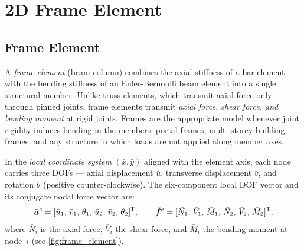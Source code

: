 \chapter{2D Frame Element}
\label{ch:frame}

\section{Frame Element}
\label{sec:frame_element}

A \emph{frame element} (beam-column) combines the axial stiffness of a bar
element with the bending stiffness of an Euler-Bernoulli beam element into a
single structural member. Unlike truss elements, which transmit axial force
only through pinned joints, frame elements transmit \emph{axial force, shear
force, and bending moment} at rigid joints. Frames are the appropriate model
whenever joint rigidity induces bending in the members: portal frames,
multi-storey building frames, and any structure in which loads are not applied
along member axes.

In the \emph{local coordinate system} $(\bar{x},\bar{y})$ aligned with the
element axis, each node carries three DOFs --- axial displacement $\bar{u}$,
transverse displacement $\bar{v}$, and rotation $\theta$ (positive
counter-clockwise). The six-component local DOF vector and its conjugate
nodal force vector are:
\begin{equation}
    \bar{\bm{u}}^e =
    [\bar{u}_1,\,\bar{v}_1,\,\theta_1,\,
     \bar{u}_2,\,\bar{v}_2,\,\theta_2]^{\mathsf{T}}, \qquad
    \bar{\bm{f}}^e =
    [\bar{N}_1,\,\bar{V}_1,\,\bar{M}_1,\,
     \bar{N}_2,\,\bar{V}_2,\,\bar{M}_2]^{\mathsf{T}},
    \label{eq:frame_dof}
\end{equation}
where $\bar{N}_i$ is the axial force, $\bar{V}_i$ the shear force, and
$\bar{M}_i$ the bending moment at node~$i$ (see \cref{fig:frame_element}).


